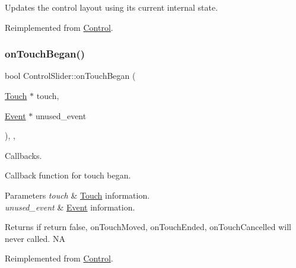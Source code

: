 Updates the control layout using its current internal state. 

Reimplemented from \hyperlink{classControl_aa3c7bd1c9d2a072c037c6c9232a336a5}{Control}.

\mbox{\label{classControlSlider_a8f6fb619bb23b4e1507f1f2bb904f808}} 
\subsubsection{\texorpdfstring{on\+Touch\+Began()}{onTouchBegan()}\hspace{0.1cm}{\footnotesize\ttfamily [1/2]}}
{\footnotesize\ttfamily bool Control\+Slider\+::on\+Touch\+Began (\begin{DoxyParamCaption}\item[{\hyperlink{classTouch}{Touch} $\ast$}]{touch,  }\item[{\hyperlink{classEvent}{Event} $\ast$}]{unused\+\_\+event }\end{DoxyParamCaption})\hspace{0.3cm}{\ttfamily [override]}, {\ttfamily [protected]}, {\ttfamily [virtual]}}



Callbacks. 

Callback function for touch began.


\begin{DoxyParams}{Parameters}
{\em touch} & \hyperlink{classTouch}{Touch} information. \\
\hline
{\em unused\+\_\+event} & \hyperlink{classEvent}{Event} information. \\
\hline
\end{DoxyParams}
\begin{DoxyReturn}{Returns}
if return false, on\+Touch\+Moved, on\+Touch\+Ended, on\+Touch\+Cancelled will never called.  NA 
\end{DoxyReturn}


Reimplemented from \hyperlink{classControl_a0cf2e20cea5b57b263e965be4a19ab52}{Control}.

\mbox{\label{classControlSlider_a501e9da8ef3f1dacbfb9f7a12ecb2aed}} 

